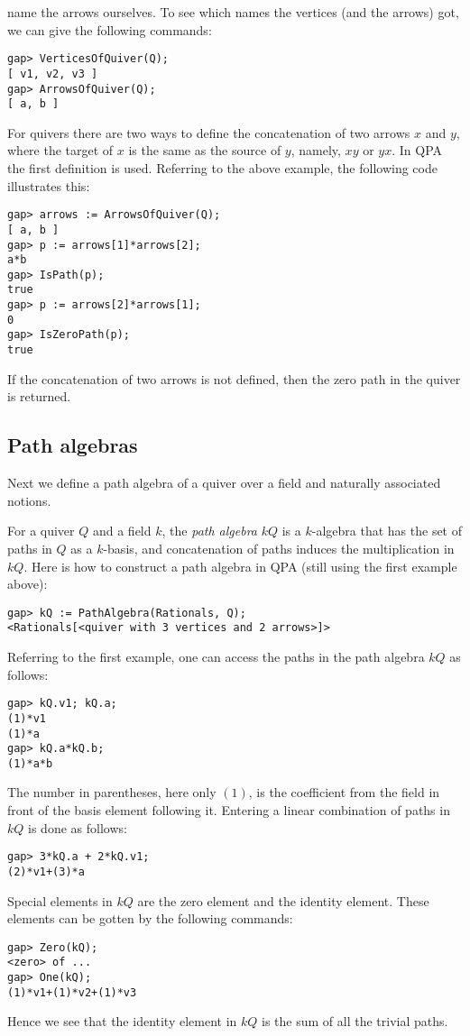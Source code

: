 \documentclass{amsart}
\theoremstyle{definition}
\theoremstyle{theoretic}
\begin{document}
name the arrows ourselves.  To see which names the vertices (and the
arrows) got, we can give the following commands:
\begin{verbatim}
gap> VerticesOfQuiver(Q);
[ v1, v2, v3 ]
gap> ArrowsOfQuiver(Q);
[ a, b ]
\end{verbatim}
For quivers there are two ways to define the concatenation of two
arrows $x$ and $y$, where the target of $x$ is the same as the source of
$y$, namely, $xy$ or $yx$.  In QPA the first definition is used.
Referring to the above example, the following code illustrates this:
\begin{verbatim}
gap> arrows := ArrowsOfQuiver(Q);
[ a, b ]
gap> p := arrows[1]*arrows[2];
a*b
gap> IsPath(p);
true
gap> p := arrows[2]*arrows[1];
0
gap> IsZeroPath(p);
true
\end{verbatim}
If the concatenation of two arrows is not defined, then the zero path
in the quiver is returned.  

\subsection{Path algebras} Next we define a path algebra of a quiver
over a field and naturally associated notions. 

For a quiver $Q$ and a field $k$, the \emph{path algebra} $kQ$ is a
$k$-algebra that has the set of paths in $Q$ as a $k$-basis, and
concatenation of paths induces the multiplication in $kQ$.  Here is
how to construct a path algebra in QPA (still using the first example
above): 
\begin{verbatim}
gap> kQ := PathAlgebra(Rationals, Q);
<Rationals[<quiver with 3 vertices and 2 arrows>]>
\end{verbatim}
Referring to the first example, one can access the paths in the path
algebra $kQ$ as follows:
\begin{verbatim}
gap> kQ.v1; kQ.a; 
(1)*v1
(1)*a
gap> kQ.a*kQ.b;
(1)*a*b
\end{verbatim}
The number in parentheses, here only $(1)$, is the coefficient from
the field in front of the basis element following it.  Entering a
linear combination of paths in $kQ$ is done as follows:
\begin{verbatim}
gap> 3*kQ.a + 2*kQ.v1;
(2)*v1+(3)*a
\end{verbatim} 
Special elements in $kQ$ are the zero element and the identity
element.  These elements can be gotten by the following commands:
\begin{verbatim}
gap> Zero(kQ);
<zero> of ...
gap> One(kQ);
(1)*v1+(1)*v2+(1)*v3
\end{verbatim}
Hence we see that the identity element in $kQ$ is the sum of all the
trivial paths. 
\end{document}
